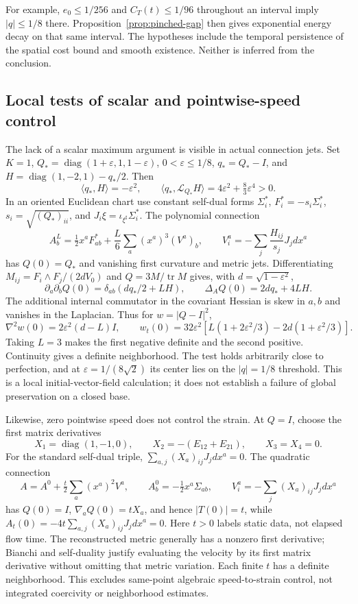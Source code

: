 \documentclass[11pt]{article}
\numberwithin{equation}{section}
\theoremstyle{definition}
\theoremstyle{remark}
\DeclareMathOperator{\tr}{tr}
\begin{document}
For example, $e_0\leq1/256$ and $C_T(t)\leq1/96$ throughout an interval
imply $|q|\leq1/8$ there. Proposition~\ref{prop:pinched-gap} then gives
exponential energy decay on that same interval. The hypotheses include
the temporal persistence of the spatial cost bound and smooth existence.
Neither is inferred from the conclusion.

\subsection{Local tests of scalar and pointwise-speed control}
\label{subsec:local-obstructions}

The lack of a scalar maximum argument is visible in actual connection
jets. Set $K=1$, $Q_*=\operatorname{diag}(1+\varepsilon,1,1-\varepsilon)$,
$0<\varepsilon\leq1/8$, $q_*=Q_*-I$, and
$H=\operatorname{diag}(1,-2,1)-q_*/2$. Then
\[
 \langle q_*,H\rangle=-\varepsilon^2,\qquad
 \langle q_*,\mathscr L_{Q_*}H\rangle
       =4\varepsilon^2+\tfrac83\varepsilon^4>0.
\]
In an oriented Euclidean chart use constant self-dual forms $\Sigma_i^*$,
$F_i^*=-s_i\Sigma_i^*$, $s_i=\sqrt{(Q_*)_{ii}}$, and
$J_i\xi=\iota_{\xi^\sharp}\Sigma_i^*$. The polynomial connection
\[
 A^L_b=\tfrac12x^aF^*_{ab}
       +\frac L6\sum_a(x^a)^3(V^a)_b,
 \qquad V_i^a=-\sum_j\frac{H_{ij}}{s_j}J_jdx^a
\]
has $Q(0)=Q_*$ and vanishing first curvature and metric jets. Differentiating
$M_{ij}=F_i\wedge F_j/(2dV_0)$ and $Q=3M/\tr M$ gives, with
$d=\sqrt{1-\varepsilon^2}$,
\[
 \partial_a\partial_bQ(0)=\delta_{ab}(dq_*/2+LH),\qquad
 \Delta_AQ(0)=2dq_*+4LH.
\]
The additional internal commutator in the covariant Hessian is skew in
$a,b$ and vanishes in the Laplacian. Thus for $w=|Q-I|^2$,
\[
 \nabla^2w(0)=2\varepsilon^2(d-L)I,\qquad
 w_t(0)=32\varepsilon^2\left[L(1+2\varepsilon^2/3)
                        -2d(1+\varepsilon^2/3)\right].
\]
Taking $L=3$ makes the first negative definite and the second positive.
Continuity gives a definite neighborhood. The test holds arbitrarily
close to perfection, and at $\varepsilon=1/(8\sqrt2)$ its center lies on
the $|q|=1/8$ threshold. This is a local initial-vector-field calculation;
it does not establish a failure of global preservation on a closed base.

Likewise, zero pointwise speed does not control the strain. At $Q=I$,
choose the first matrix derivatives
\[
 X_1=\operatorname{diag}(1,-1,0),\qquad
 X_2=-(E_{12}+E_{21}),\qquad X_3=X_4=0.
\]
For the standard self-dual triple,
$\sum_{a,j}(X_a)_{ij}J_jdx^a=0$. The quadratic connection
\[
 A=A^0+\tfrac t2\sum_a(x^a)^2V^a,\qquad
 A^0_b=-\tfrac12x^a\Sigma_{ab},\qquad
 V_i^a=-\sum_j(X_a)_{ij}J_jdx^a
\]
has $Q(0)=I$, $\nabla_aQ(0)=tX_a$, and hence $|T(0)|=t$, while
$A_t(0)=-4t\sum_{a,j}(X_a)_{ij}J_jdx^a=0$.
Here $t>0$ labels static data, not elapsed flow time. The reconstructed
metric generally has a nonzero first derivative; Bianchi and self-duality
justify evaluating the velocity by its first matrix derivative without
omitting that metric variation. Each finite $t$ has a definite neighborhood.
This excludes same-point algebraic speed-to-strain control, not integrated
coercivity or neighborhood estimates.
\end{document}
